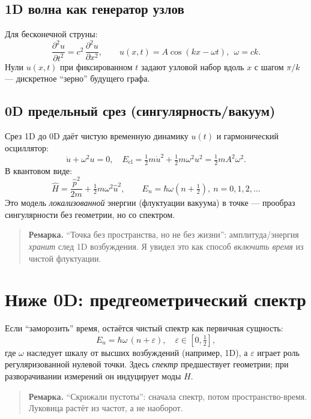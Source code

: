 \documentclass[12pt,a4paper]{article}
\begin{document}
\subsection{1D волна как генератор узлов}
Для бесконечной струны:
\[
\frac{\partial^2 u}{\partial t^2} = c^2\,\frac{\partial^2 u}{\partial x^2},\qquad
u(x,t)=A\cos(kx-\omega t),\ \ \omega=ck.
\]
Нули $u(x,t)$ при фиксированном $t$ задают узловой набор вдоль $x$ с шагом $\pi/k$ — дискретное ``зерно'' будущего графа. %

\subsection{0D предельный срез (сингулярность/вакуум)}
Срез 1D до 0D даёт чистую временную динамику $u(t)$ и гармонический осциллятор:
\[
\ddot u + \omega^2 u=0,\quad 
E_{\text{cl}}=\tfrac12 m\dot u^2+\tfrac12 m\omega^2 u^2=\tfrac12 m A^2\omega^2.
\]
В квантовом виде:
\[
\hat H=\frac{\hat p^2}{2m}+\tfrac12 m\omega^2\hat u^2,\qquad
E_n=\hbar\omega\!\left(n+\tfrac12\right),\ n=0,1,2,\dots
\]
Это модель \emph{локализованной} энергии (флуктуации вакуума) в точке — прообраз сингулярности без геометрии, но со спектром.

\begin{quote}\textbf{Ремарка.}
``Точка без пространства, но не без жизни'': амплитуда/энергия \emph{хранит} след 1D возбуждения. Я увидел это как способ \emph{включить время} из чистой флуктуации.
\end{quote}

\section{Ниже 0D: предгеометрический спектр}
Если ``заморозить'' время, остаётся чистый спектр как первичная сущность:
\[
E_n=\hbar\omega\,(n+\varepsilon),\quad \varepsilon\in[0,\tfrac12],
\]
где $\omega$ наследует шкалу от высших возбуждений (например, 1D), а $\varepsilon$ играет роль регуляризованной нулевой точки. Здесь \emph{спектр} предшествует геометрии; при разворачивании измерений он индуцирует моды $H$.

\begin{quote}\textbf{Ремарка.}
``Скрижали пустоты'': сначала спектр, потом пространство-время. Луковица растёт из частот, а не наоборот.
\end{quote}

\end{document}
